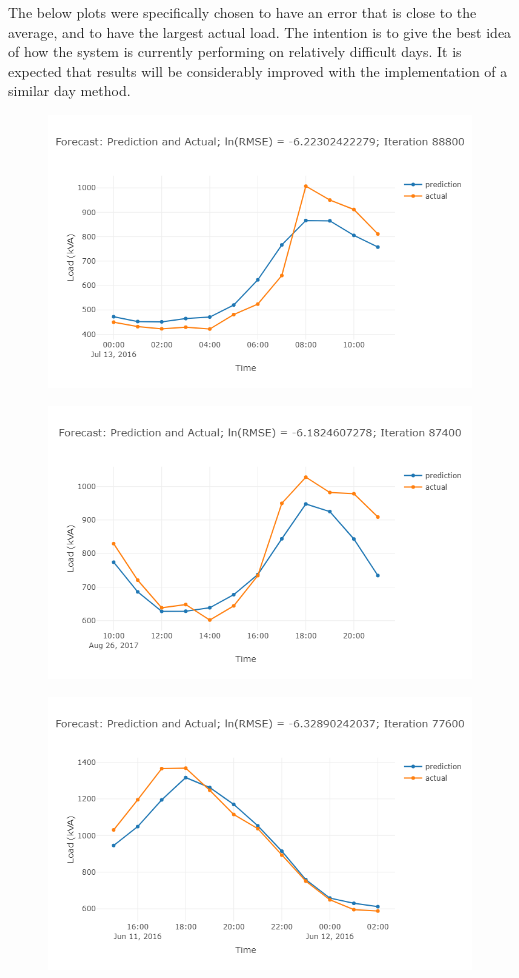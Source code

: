 The below plots were specifically chosen to have an error that is close to the average, and to have the largest actual load. The intention is to give the best idea of how the system is currently performing on relatively difficult days.
It is expected that results will be considerably improved with the implementation of a similar day method.
\begin{figure}
	\centering
	\includegraphics[width=0.95\linewidth]{images/prelim-plots/newplot}
	\caption{}
\end{figure}

\begin{figure}
\centering
\includegraphics[width=0.95\linewidth]{"images/prelim-plots/newplot (1)"}
\caption{}
\end{figure}

\begin{figure}
\centering
\includegraphics[width=0.95\linewidth]{"images/prelim-plots/newplot (2)"}
\caption{}
\end{figure}

